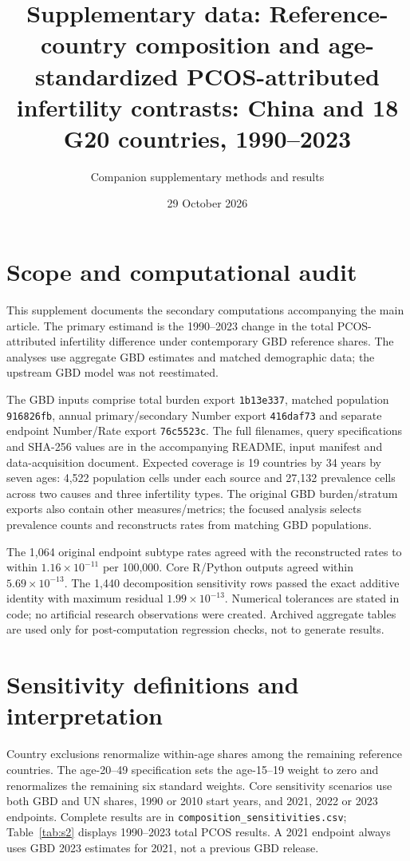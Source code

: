 \documentclass[11pt,a4paper]{article}
\title{Supplementary data: Reference-country composition and age-standardized PCOS-attributed infertility contrasts: China and 18 G20 countries, 1990--2023}
\author{Companion supplementary methods and results}
\date{29 October 2026}
\begin{document}
\maketitle\thispagestyle{fancy}
\renewcommand{\thetable}{S\arabic{table}}\setcounter{table}{0}
\renewcommand{\thefigure}{S\arabic{figure}}\setcounter{figure}{0}
\section{Scope and computational audit}
This supplement documents the secondary computations accompanying the main article. The primary estimand is the 1990--2023 change in the total PCOS-attributed infertility difference under contemporary GBD reference shares. The analyses use aggregate GBD estimates and matched demographic data; the upstream GBD model was not reestimated.

The GBD inputs comprise total burden export \texttt{1b13e337}, matched population \texttt{916826fb}, annual primary/secondary Number export \texttt{416daf73} and separate endpoint Number/Rate export \texttt{76c5523c}. The full filenames, query specifications and SHA-256 values are in the accompanying README, input manifest and data-acquisition document. Expected coverage is 19 countries by 34 years by seven ages: 4,522 population cells under each source and 27,132 prevalence cells across two causes and three infertility types. The original GBD burden/stratum exports also contain other measures/metrics; the focused analysis selects prevalence counts and reconstructs rates from matching GBD populations.

The 1,064 original endpoint subtype rates agreed with the reconstructed rates to within $1.16\times10^{-11}$ per 100,000. Core R/Python outputs agreed within $5.69\times10^{-13}$. The 1,440 decomposition sensitivity rows passed the exact additive identity with maximum residual $1.99\times10^{-13}$. Numerical tolerances are stated in code; no artificial research observations were created. Archived aggregate tables are used only for post-computation regression checks, not to generate results.

\section{Sensitivity definitions and interpretation}
Country exclusions renormalize within-age shares among the remaining reference countries. The age-20--49 specification sets the age-15--19 weight to zero and renormalizes the remaining six standard weights. Core sensitivity scenarios use both GBD and UN shares, 1990 or 2010 start years, and 2021, 2022 or 2023 endpoints. Complete results are in \texttt{composition\_sensitivities.csv}; Table~\ref{tab:s2} displays 1990--2023 total PCOS results. A 2021 endpoint always uses GBD 2023 estimates for 2021, not a previous GBD release.
\end{document}
